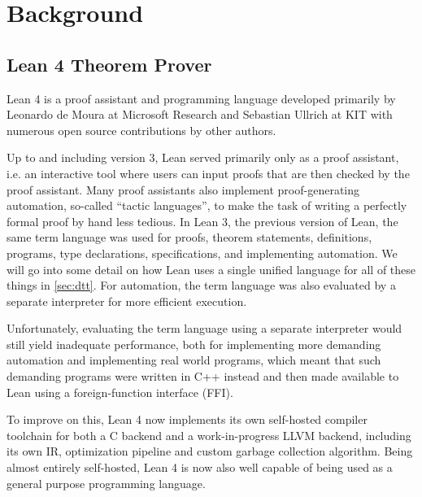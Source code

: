 \chapter{Background}\label{sec:background}

\section{Lean 4 Theorem Prover}
Lean 4 is a proof assistant and programming language developed primarily by Leonardo de Moura at Microsoft Research and Sebastian Ullrich at KIT with numerous open source contributions by other authors.

Up to and including version 3, Lean served primarily only as a proof assistant, i.e. an interactive tool where users can input proofs that are then checked by the proof assistant. Many proof assistants also implement proof-generating automation, so-called ``tactic languages'', to make the task of writing a perfectly formal proof by hand less tedious. In Lean 3, the previous version of Lean, the same term language was used for proofs, theorem statements, definitions, programs, type declarations, specifications, and implementing automation. We will go into some detail on how Lean uses a single unified language for all of these things in \cref{sec:dtt}. For automation, the term language was also evaluated by a separate interpreter for more efficient execution.

Unfortunately, evaluating the term language using a separate interpreter would still yield inadequate performance, both for implementing more demanding automation and implementing real world programs, which meant that such demanding programs were written in C++ instead and then made available to Lean using a foreign-function interface (FFI). \citep{ullrich_counting_2020}

To improve on this, Lean 4 now implements its own self-hosted compiler toolchain for both a C backend and a work-in-progress LLVM backend, including its own IR, optimization pipeline and custom garbage collection algorithm. Being almost entirely self-hosted, Lean 4 is now also well capable of being used as a general purpose programming language.

